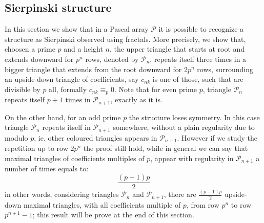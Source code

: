 \documentclass[10pt,a4paper]{article} %
\begin{document}
    \subsection{Sierpinski structure}

    In this section we show that in a Pascal array $\mathcal{P}$ it is
    possible to recognize a structure as Sierpinski observed using
    fractals. More precisely, we show that, choosen a prime $p$ and a
    height $n$, the upper triangle that starts at root and extends
    downward for $p^n$ rows, denoted by $\mathcal{P}_n$, repeats
    itself three times in a bigger triangle that extends from the root
    downward for $2p^{n}$ rows, surrounding an upside-down triangle of
    coefficients, say $c_{nk}$ is one of those, such that are divisible
    by $p$ all, formally $c_{nk} \equiv_p 0$. Note that for even prime
    $p$, triangle $\mathcal{P}_n$ repeats itself $p+1$ times in
    $\mathcal{P}_{n+1}$, exactly as it is.
    
    On the other hand, for an odd prime $p$ the structure loses
    symmetry. In this case triangle $\mathcal{P}_n$ repeats itself in
    $\mathcal{P}_{n+1}$ somewhere, without a plain regularity due to
    modulo $p$, ie. other coloured triangles appears in
    $\mathcal{P}_{n+1}$.  However if we study the repetition up to row
    $2p^n$ the proof still hold, while in general we can say that
    maximal triangles of coefficients multiples of $p$, appear with regularity
    in $\mathcal{P}_{n+1}$ a number of times equals to:
    \begin{displaymath}
        \frac{(p-1)p}{2}
    \end{displaymath}
    in other words, considering triangles $\mathcal{P}_{n}$ and
    $\mathcal{P}_{n+1}$, there are $\frac{(p-1)p}{2}$ upside-down
    maximal triangles, with all coefficients multiple of $p$, from row $p^n$
    to row $p^{n+1}-1$; this result will be prove at the end of this 
    section.
\end{document}
